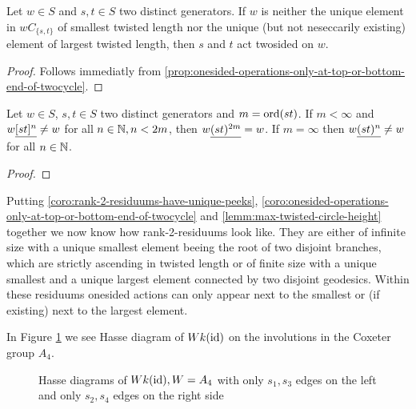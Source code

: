 \begin{coro}
	Let $w \in S$ and $s,t \in S$ two distinct generators. If $w$ is neither the unique element in $wC_{\{s,t\}}$ of smallest twisted length nor the unique (but not neseccarily existing) element of largest twisted length, then $s$ and $t$ act twosided on $w$.

	\begin{proof}
		Follows immediatly from \ref{prop:onesided-operations-only-at-top-or-bottom-end-of-twocycle}.
	\end{proof}
\end{coro}

\begin{lemm}
	Let $w \in S$, $s,t \in S$ two distinct generators and $m = \operatorname{ord}(st)$. If $m < \infty$ and $w \underline{[st]^n} \neq w$ for all $n \in \mathbb{N}, n < 2m$, then $w \underline{(st)^{2m}} = w$. If $m = \infty$ then $w \underline{(st)^n} \neq w$ for all $n \in \mathbb{N}$.

	\begin{proof}
		\todo
	\end{proof}
\end{lemm}

Putting \ref{coro:rank-2-residuums-have-unique-peeks}, \ref{coro:onesided-operations-only-at-top-or-bottom-end-of-twocycle} and \ref{lemm:max-twisted-circle-height} together we now know how rank-2-residuums look like. They are either of infinite size with a unique smallest element beeing the root of two disjoint branches, which are strictly ascending in twisted length or of finite size with a unique smallest and a unique largest element connected by two disjoint geodesics. Within these residuums onesided actions can only appear next to the smallest or (if existing) next to the largest element.

\begin{exam}
	In Figure \ref{fig:a4_s1s3-and-a4_s2s4} we see Hasse diagram of $Wk(\operatorname{id})$ on the involutions in the Coxeter group $A_4$.
	\begin{figure}[ht]
		\centering
		
		\quad \quad \quad
		
		\caption{Hasse diagrams of $Wk(\operatorname{id}), W = A_4$ with only $s_1,s_3$ edges on the left and only $s_2,s_4$ edges on the right side}
		\label{fig:a4_s1s3-and-a4_s2s4}
	\end{figure}
\end{exam}
